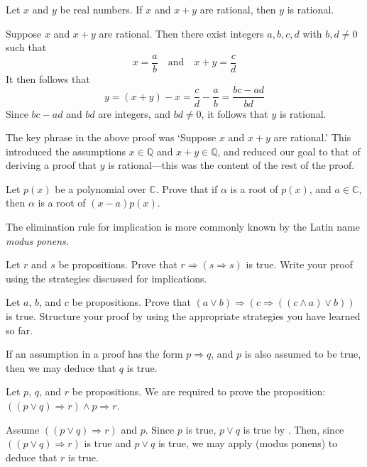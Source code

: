 \begin{proposition}
\label{propRationalTwoOfThree}
Let $x$ and $y$ be real numbers. If $x$ and $x+y$ are rational, then $y$ is rational.
\end{proposition}

\begin{cproof}
Suppose $x$ and $x+y$ are rational. Then there exist integers $a,b,c,d$ with $b,d \ne 0$ such that
\[
x = \frac{a}{b} \quad \text{and} \quad x+y = \frac{c}{d}
\]
It then follows that
\[
y = (x+y)-x = \frac{c}{d}-\frac{a}{b} = \frac{bc-ad}{bd}
\]
Since $bc-ad$ and $bd$ are integers, and $bd \ne 0$, it follows that $y$ is rational.
\end{cproof}

The key phrase in the above proof was `Suppose $x$ and $x+y$ are rational.' This introduced the assumptions $x \in \mathbb{Q}$ and $x+y \in \mathbb{Q}$, and reduced our goal to that of deriving a proof that $y$ is rational---this was the content of the rest of the proof.

\begin{exercise}
Let $p(x)$ be a polynomial over $\mathbb{C}$. Prove that if $\alpha$ is a root of $p(x)$, and $a \in \mathbb{C}$, then $\alpha$ is a root of $(x-a)p(x)$.
\end{exercise}

The elimination rule for implication \elimrule{\Rightarrow} is more commonly known by the Latin name \textit{modus ponens}.

\begin{exercise}
Let $r$ and $s$ be propositions. Prove that $r \Rightarrow (s \Rightarrow s)$ is true. Write your proof using the strategies discussed for implications.
\end{exercise}

\begin{exercise}
Let $a$, $b$, and $c$ be propositions. Prove that $(a \vee b) \Rightarrow (c \Rightarrow ((c \wedge a) \vee b))$ is true. Structure your proof by using the appropriate strategies you have learned so far.
\end{exercise}

\begin{strategy}
\label{strAssumingImplicationsDirect}
If an assumption in a proof has the form $p \Rightarrow q$, and $p$ is also assumed to be true, then we may deduce that $q$ is true.
\end{strategy}

\begin{example}
Let $p$, $q$, and $r$ be propositions. We are required to prove the proposition: $((p \vee q) \Rightarrow r) \wedge p \Rightarrow r$.

Assume $((p \vee q) \Rightarrow r)$ and $p$. Since $p$ is true, $p \vee q$ is true by . Then, since $((p \vee q) \Rightarrow r)$ is true and $p \vee q$ is true, we may apply  (modus ponens) to deduce that $r$ is true.
\end{example}

